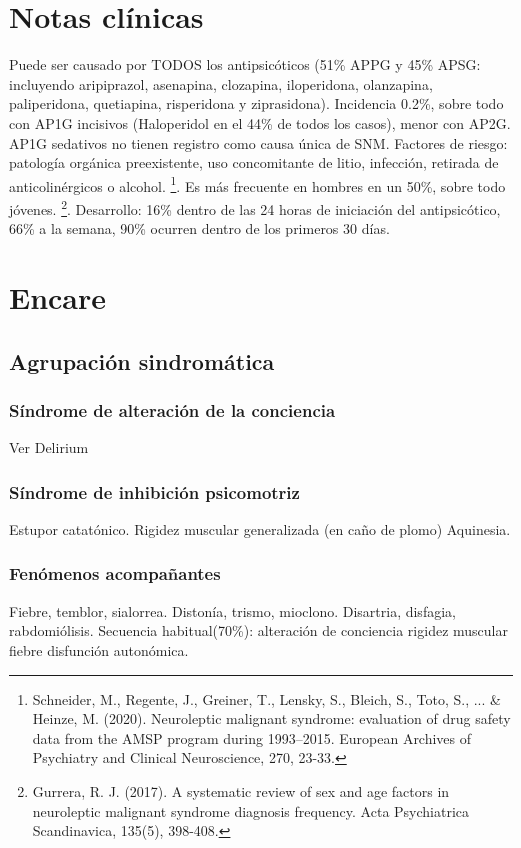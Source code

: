 \documentclass{scrbook}
\begin{document}
\section*{Notas clínicas}
Puede ser causado por TODOS los antipsicóticos (51\% APPG y 45\% APSG: incluyendo aripiprazol, asenapina, clozapina, iloperidona, olanzapina, paliperidona, quetiapina, risperidona y ziprasidona). Incidencia 0.2\%, sobre todo con AP1G incisivos (Haloperidol en el 44\% de todos los casos), menor con AP2G. AP1G sedativos no tienen registro como causa única de SNM. 
Factores de riesgo: patología orgánica preexistente, uso concomitante de litio, infección, retirada de anticolinérgicos o alcohol. \footnote{Schneider, M., Regente, J., Greiner, T., Lensky, S., Bleich, S., Toto, S., ... \& Heinze, M. (2020). Neuroleptic malignant syndrome: evaluation of drug safety data from the AMSP program during 1993–2015. European Archives of Psychiatry and Clinical Neuroscience, 270, 23-33.}. Es más frecuente en hombres en un 50\%, sobre todo jóvenes. \footnote{Gurrera, R. J. (2017). A systematic review of sex and age factors in neuroleptic malignant syndrome diagnosis frequency. Acta Psychiatrica Scandinavica, 135(5), 398-408.}. 
Desarrollo: 16\% dentro de las 24 horas de iniciación del antipsicótico, 66\% a la semana, 90\% ocurren dentro de los primeros 30 días.
\section*{Encare}
\subsection*{Agrupación sindromática}
\subsubsection*{Síndrome de alteración de la conciencia}
Ver Delirium
\subsubsection*{Síndrome de inhibición psicomotriz}
Estupor catatónico.
Rigidez muscular generalizada (en caño de plomo)
Aquinesia.
\subsubsection*{Fenómenos acompañantes}
Fiebre, temblor, sialorrea. Distonía, trismo, mioclono. Disartria, disfagia, rabdomiólisis.
Secuencia habitual(70\%): alteración de conciencia \faArrowRight rigidez muscular \faArrowRight fiebre \faArrowRight disfunción autonómica.
\end{document}
